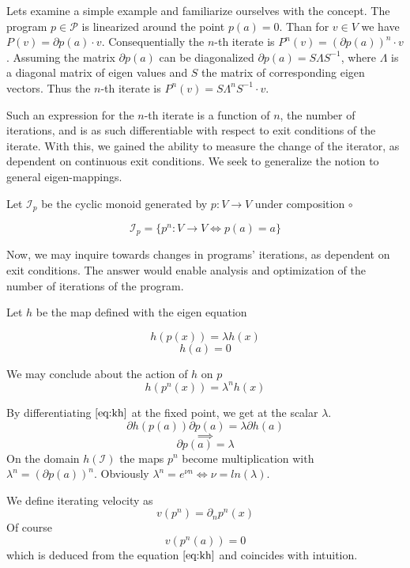 \documentclass{article}
\newcommand{\dP}{\mathcal{P}}
\newcommand{\D}{\partial}
\begin{document}
  Lets examine a simple example and familiarize ourselves with the concept. The program $p\in\dP$ is linearized around the point $p(a)=0$. Than for $v\in V$ we have $P(v)=\D p(a)\cdot v$. Consequentially the $n$-th iterate is $P^n(v)=(\D p(a))^n\cdot v$. Assuming the matrix $\D p(a)$ can be diagonalized $\D p(a)=S\Lambda S^{-1}$, where $\Lambda$ is a diagonal matrix of eigen values and $S$ the matrix of corresponding eigen vectors. Thus the $n$-th iterate is $P^n(v)=S\Lambda^nS^{-1}\cdot v$.
  
  Such an expression for the $n$-th iterate is a function of $n$, the number of iterations, and is as such differentiable with respect to exit conditions of the iterate. With this, we gained the ability to measure the change of the iterator, as dependent on continuous exit conditions. We seek to generalize the notion to general eigen-mappings.
  
  Let $\mathcal{I}_p$ be the cyclic monoid generated by $p:V\to V$ under composition $\circ$
  
  \begin{equation}
  \mathcal{I}_p=\{p^n:V\to V\iff p(a)=a\}
  \end{equation}
  
  Now, we may inquire towards changes in programs' iterations, as dependent on exit conditions. The answer would enable analysis and optimization of the number of iterations of the program. 
  
  Let $h$ be the map defined with the eigen equation
    
  \begin{equation}\label{eq:kh}
  h(p(x))=\lambda h(x)
  \end{equation}
   \begin{equation}
   h(a)=0
   \end{equation}
  
  We may conclude about the action of $h$ on $p$
  \begin{equation}
  h(p^n(x))=\lambda^nh(x)
  \end{equation}
  
  By differentiating $\eqref{eq:kh}$ at the fixed point, we get at the scalar $\lambda$.
  $$\D h(p(a))\D p(a)=\lambda\D h(a)$$
  $$\implies$$
  $$\D p(a)=\lambda$$
  On the domain $h(\mathcal{I})$ the maps $p^n$ become multiplication with $\lambda^n=(\D p(a))^n$. Obviously $\lambda^n=e^{\nu n}\iff \nu=ln(\lambda)$.
  
  We define iterating velocity as
  \begin{equation}
  v(p^n)=\D_np^n(x)
  \end{equation}
  Of course
  \begin{equation}
  v(p^n(a))=0
  \end{equation}
  which is deduced from the equation $\eqref{eq:kh}$ and coincides with intuition.
  
\end{document}
